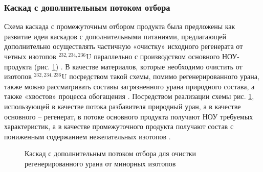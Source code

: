 \subsubsection{Каскад с дополнительным потоком отбора}

Схема каскада с промежуточным отбором продукта была предложены как развитие идеи каскадов с дополнительными питаниями, предлагающей дополнительно осуществлять частичную
«очистку» исходного регенерата от четных изотопов $^{232,234,236}$U параллельно с производством основного НОУ-продукта (рис. \ref{fig:3_out}) \cite{zhurinSPOSOBPERERABOTKIZAGRYaZNENNOGO, palkinAnaliticheskiyRaschetSoderzhaniya2007}. В качестве материалов, которые необходимо очистить от изотопов $^{232,234,236}$U посредством такой схемы, помимо регенерированного урана, также можно рассматривать составы загрязненного урана природного состава, а также «хвостов» процесса обогащения \cite{palkinSeparationUraniumIsotopes2010}. Посредством реализации схемы рис. \ref{fig:3_out}, использующей в качестве потока разбавителя природный уран, а в качестве основного -- регенерат, в потоке основного продукта получают НОУ требуемых характеристик, а в качестве промежуточного продукта получают состав с пониженным содержанием нежелательных изотопов \cite{palkinSeparationUraniumIsotopes2010}.
\begin{figure}[ht]
  \caption{Каскад с дополнительным потоком отбора для очистки регенерированного урана от минорных изотопов}\label{fig:3_out}
\end{figure}

